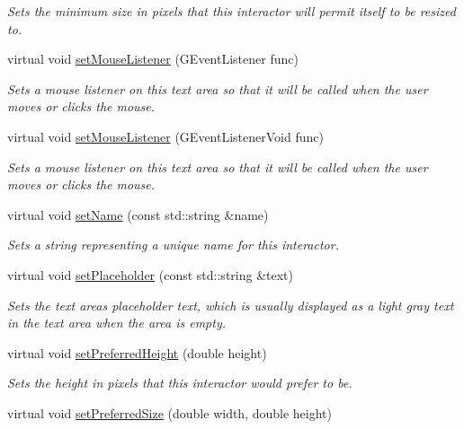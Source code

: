 \begin{DoxyCompactItemize}
\begin{DoxyCompactList}\small\item\em Sets the minimum size in pixels that this interactor will permit itself to be resized to. \end{DoxyCompactList}\item 
virtual void \mbox{\hyperlink{classGTextArea_a37d8dbc943f59920f705b0104f60bde2}{set\+Mouse\+Listener}} (G\+Event\+Listener func)
\begin{DoxyCompactList}\small\item\em Sets a mouse listener on this text area so that it will be called when the user moves or clicks the mouse. \end{DoxyCompactList}\item 
virtual void \mbox{\hyperlink{classGTextArea_aea7f647ea62d59f71b5fad6aa65eeaf9}{set\+Mouse\+Listener}} (G\+Event\+Listener\+Void func)
\begin{DoxyCompactList}\small\item\em Sets a mouse listener on this text area so that it will be called when the user moves or clicks the mouse. \end{DoxyCompactList}\item 
virtual void \mbox{\hyperlink{classGInteractor_a9d3a2685df23b5e7cbf59c19c4a1f9b5}{set\+Name}} (const std\+::string \&name)
\begin{DoxyCompactList}\small\item\em Sets a string representing a unique name for this interactor. \end{DoxyCompactList}\item 
virtual void \mbox{\hyperlink{classGTextArea_aa21a9bebb4652ab6780d0c11eff47aee}{set\+Placeholder}} (const std\+::string \&text)
\begin{DoxyCompactList}\small\item\em Sets the text area\textquotesingle{}s placeholder text, which is usually displayed as a light gray text in the text area when the area is empty. \end{DoxyCompactList}\item 
virtual void \mbox{\hyperlink{classGInteractor_a1ab987704fce32098706c6f00fb08218}{set\+Preferred\+Height}} (double height)
\begin{DoxyCompactList}\small\item\em Sets the height in pixels that this interactor would prefer to be. \end{DoxyCompactList}\item 
virtual void \mbox{\hyperlink{classGInteractor_a042c5ae19430d765ef552371cae3632c}{set\+Preferred\+Size}} (double width, double height)

\end{DoxyCompactItemize}
